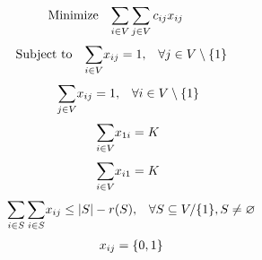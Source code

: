 \begin{equation}
    \begin{array}{ll@{}ll}
        \text{Minimize} & \displaystyle\sum\limits_{i \in V}\sum\limits_{j \in V} c_{ij}&x_{ij} &\\
    \end{array}
\end{equation}
\begin{equation}
    \begin{array}{ll@{}ll}
        \text{Subject to}&\displaystyle\sum\limits_{i \in V}   &x_{ij} = 1,  &\forall j \in V \setminus \{1\}\\
    \end{array}
\end{equation}
\begin{equation}
    \begin{array}{ll@{}ll}
        & \displaystyle\sum\limits_{j \in V}   &x_{ij} = 1,  &\forall i \in V \setminus \{1\}\\
    \end{array}
\end{equation}
\begin{equation}
    \begin{array}{ll@{}ll}
        & \displaystyle\sum\limits_{i \in V}   &x_{1i} = K\\
    \end{array}
\end{equation}
\begin{equation}
    \begin{array}{ll@{}ll}
        & \displaystyle\sum\limits_{i \in V}   &x_{i1} = K\\
    \end{array}
\end{equation}
\begin{equation}
    \begin{array}{ll@{}ll@{}ll}
        & \displaystyle\sum\limits_{i \in S}\sum\limits_{i \in S}  &x_{ij} \leq |S| - r(S), &\forall S \subseteq V/ \{1\} , S \neq \oldemptyset \\
    \end{array}
\end{equation}
\begin{equation}
    \begin{array}{ll@{}ll@{}ll}
        & x_{ij} = \{0,1\}\\
    \end{array}
\end{equation}

\vspace{1cm}

